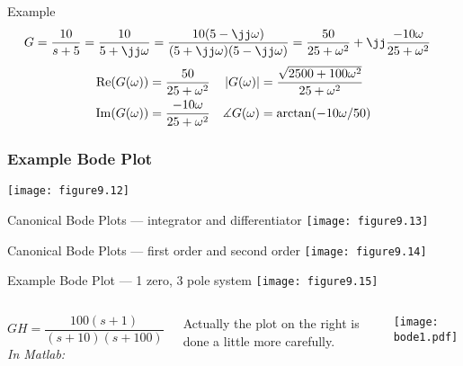 \documentclass{beamer-control}
\begin{document}
\begin{frame}{Example}
  \begin{align*}
  G &= \frac{10}{s+5}
    = \frac{10}{5+\jj\ww}
     = \frac{10(5-\jj\ww)}{(5+\jj\ww)(5-\jj\ww)}
     = \frac{50}{25+\ww^2} + \jj\frac{-10\ww}{25+\ww^2}
  \end{align*}
  \bigskip
  \begin{align*}
  \operatorname{Re}(G(\omega)) & = \frac{50}{25+\omega^2} &
  \lvert G(\omega)\rvert & = \frac{\sqrt{2500+100\omega^2}}{25+\omega^2} \\
  \operatorname{Im}(G(\omega)) & = \frac{-10\omega}{25+\omega^2} &
  \measuredangle G(\omega) & = \arctan(-10\omega/50)
  \end{align*}
\end{frame}

\begin{frame}
\frametitle{Example Bode Plot}
\centering
\texttt{[image: figure9.12]}

\end{frame}


\begin{frame}{Canonical Bode Plots --- integrator and differentiator}
\centering
\texttt{[image: figure9.13]}

\end{frame}

\begin{frame}{Canonical Bode Plots --- first order and second order}
\centering
\texttt{[image: figure9.14]}

\end{frame}

\begin{frame}{Example Bode Plot --- 1 zero, 3 pole system}
\centering
\texttt{[image: figure9.15]}

\end{frame}




\begin{frame}
\begin{columns}
\[
  GH = \frac{100(s+1)}{(s+10)(s+100)}
\]
\bigskip
\emph{In Matlab:}


\bigskip
{\tiny Actually the plot on the right is done a little more carefully.\par}

\texttt{[image: bode1.pdf]}
\end{columns}
\end{frame}
\end{document}
